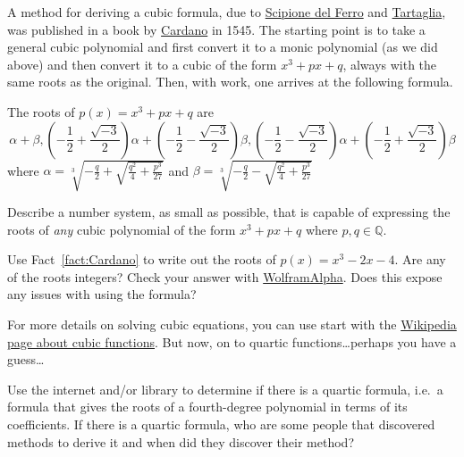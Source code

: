 A method for deriving a cubic formula, due to \href{https://en.wikipedia.org/wiki/Scipione_del_Ferro}{Scipione del Ferro} and \href{https://en.wikipedia.org/wiki/Niccolo_Fontana_Tartaglia}{Tartaglia}, was published in a book by \href{https://en.wikipedia.org/wiki/Gerolamo_Cardano}{Cardano} in 1545. The starting point is to take a general cubic polynomial and first convert it to a monic polynomial (as we did above) and then convert it to a cubic of the form $x^3 + px +q$, always with the same roots as the original. Then, with work, one arrives at the following formula. 

\begin{fact}\label{fact:Cardano}
The roots of $p(x) = x^3 + px + q$ are \[\alpha + \beta, \left(-\frac{1}{2} + \frac{\sqrt{-3}}{2}\right)\alpha + \left(-\frac{1}{2} - \frac{\sqrt{-3}}{2}\right)\beta, \left(-\frac{1}{2} - \frac{\sqrt{-3}}{2}\right)\alpha + \left(-\frac{1}{2} + \frac{\sqrt{-3}}{2}\right)\beta\]
where $\alpha = \sqrt[3]{-\frac{q}{2} + \sqrt{\frac{q^2}{4}+\frac{p^3}{27}}}$ and $\beta = \sqrt[3]{-\frac{q}{2} - \sqrt{\frac{q^2}{4}+\frac{p^3}{27}}}$
\end{fact}

\begin{problem}
Describe a number system, as small as possible, that is capable of expressing the roots of \emph{any} cubic polynomial of the form $x^3 + px + q$ where $p,q\in \mathbb{Q}$.
\end{problem}

\begin{problem}
Use Fact~\ref{fact:Cardano} to write out the roots of $p(x) = x^3-2x-4$. Are any of the roots integers? Check your answer with \href{https://www.wolframalpha.com}{WolframAlpha}. Does this expose any issues with using the formula?
\end{problem}

For more details on solving cubic equations, you can use start with the \href{https://en.wikipedia.org/wiki/Cubic_function#Derivation_of_the_roots}{Wikipedia page about cubic functions}. But now, on to quartic functions\ldots perhaps you have a guess\ldots

\begin{problem}
Use the internet and/or library to determine if there is a quartic formula, i.e.~a formula that gives the roots of a fourth-degree polynomial in terms of its coefficients. If there is a quartic formula, who are some people that discovered methods to derive it and when did they discover their method?
\end{problem}

